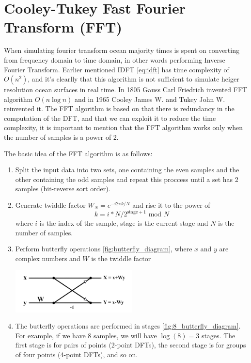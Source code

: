 \section{Cooley-Tukey Fast Fourier Transform (FFT)}
When simulating fourier transform ocean majority times is spent on converting from frequency domain to time domain, in other words performing Inverse Fourier Transform.
Earlier mentioned IDFT \ref{eq:idft} has time complexity of $O(n^2)$, and it's clearlly that this algorithm is not sufficient to simulate heiger resolution ocean surfaces in real time.
In 1805 Gauss Carl Friedrich \cite{gauss1866} invented FFT algorithm $O(n\log n)$ and in 1965 Cooley James W. and Tukey John W. \cite{cooley1965} reinvented it.
The FFT algorithm is based on that there is redundancy in the computation of the DFT, and that we can exploit it to reduce the time complexity, it is important to mention that the FFT algorithm works only when the number of samples is a power of 2.

The basic idea of the FFT algorithm is as follows:
\begin{enumerate}
    \item Split the input data into two sets, one containing the even samples and the other containing the odd samples and repeat this proccess until a set has 2 samples (bit-reverse sort order).
    \item Generate twiddle factor $W_N = e^{-i 2 \pi k / N}$ and rise it to the power of \\
    \begin{equation}
        k = i * N / 2^{\text{stage} + 1} \text{ mod } N
    \end{equation}
    where $i$ is the index of the sample, stage is the current stage and $N$ is the number of samples.
    \item Perform butterfly operations \ref{fig:butterfly_diagram}, where $x$ and $y$ are complex numbers and $W$ is the twiddle factor

    \begin{minipage}{1\textwidth}
        \centering
        \includegraphics[width=0.5\textwidth]{"images/butterfly_diagram.png"}
        \label{fig:butterfly_diagram}
    \end{minipage}

    \item The butterfly operations are performed in stages \ref{fig:8_butterfly_diagram}. For example, if we have 8 samples, we will have $\log(8) = 3 $ stages. The first stage is for pairs of points (2-point DFTs), the second stage is for groups of four points (4-point DFTs), and so on.
\end{enumerate}

